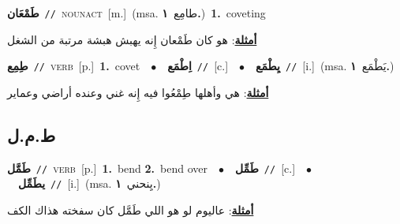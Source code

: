 \documentclass[10pt,a4paper,twoside]{article} %
\begin{document}
\begin{multicols}{2}
{\setlength\topsep{0pt}\textbf{\foreignlanguage{arabic}{طَمْعَان}}\ {\color{gray}\texttt{//}\color{black}}\ \textsc{noun\textunderscore act}\ [m.]\ \color{gray}(msa. \foreignlanguage{arabic}{طامِع}~\foreignlanguage{arabic}{\textbf{١.}})\color{black}\ \textbf{1.}~coveting\  \begin{flushright}\color{gray}\foreignlanguage{arabic}{\textbf{\underline{\foreignlanguage{arabic}{أمثلة}}}: هو كان طَمْعان إِنه يهبش هبشة مرتبة من الشغل}\end{flushright}\color{black}} \vspace{2mm}

{\setlength\topsep{0pt}\textbf{\foreignlanguage{arabic}{طِمِع}}\ {\color{gray}\texttt{//}\color{black}}\ \textsc{verb}\ [p.]\ \textbf{1.}~covet\ \ $\bullet$\ \ \setlength\topsep{0pt}\textbf{\foreignlanguage{arabic}{اِطْمَع}}\ {\color{gray}\texttt{//}\color{black}}\ [c.]\ \ $\bullet$\ \ \setlength\topsep{0pt}\textbf{\foreignlanguage{arabic}{يِطْمَع}}\ {\color{gray}\texttt{//}\color{black}}\ [i.]\ \color{gray}(msa. \foreignlanguage{arabic}{يَطْمَع}~\foreignlanguage{arabic}{\textbf{١.}})\color{black}\  \begin{flushright}\color{gray}\foreignlanguage{arabic}{\textbf{\underline{\foreignlanguage{arabic}{أمثلة}}}: هي وأهلها طِمْعُوا فيه إِنه غني وعنده أراضي وعماير}\end{flushright}\color{black}} \vspace{2mm}

\vspace{-3mm}
\subsection*{\color{blue}\foreignlanguage{arabic}{ط.م.ل}\color{blue}{}} 

{\setlength\topsep{0pt}\textbf{\foreignlanguage{arabic}{طَمَّل}}\ {\color{gray}\texttt{//}\color{black}}\ \textsc{verb}\ [p.]\ \textbf{1.}~bend  \textbf{2.}~bend over\ \ $\bullet$\ \ \setlength\topsep{0pt}\textbf{\foreignlanguage{arabic}{طَمِّل}}\ {\color{gray}\texttt{//}\color{black}}\ [c.]\ \ $\bullet$\ \ \setlength\topsep{0pt}\textbf{\foreignlanguage{arabic}{يطَمِّل}}\ {\color{gray}\texttt{//}\color{black}}\ [i.]\ \color{gray}(msa. \foreignlanguage{arabic}{يِنحني}~\foreignlanguage{arabic}{\textbf{١.}})\color{black}\  \begin{flushright}\color{gray}\foreignlanguage{arabic}{\textbf{\underline{\foreignlanguage{arabic}{أمثلة}}}: عاليوم لو هو اللي طَمَّل كان سفخته هذاك الكف}\end{flushright}\color{black}} \vspace{2mm}


\end{multicols}
\end{document}
